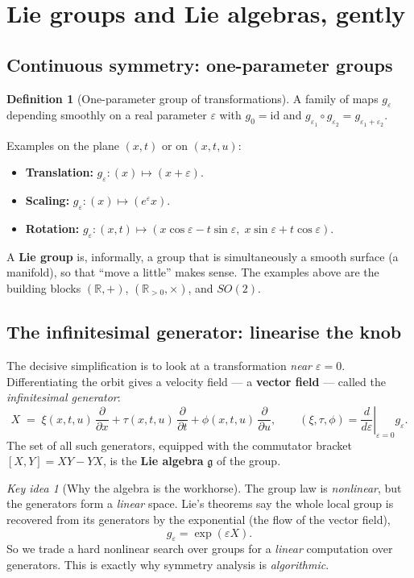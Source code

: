 \documentclass[11pt]{article}
\theoremstyle{definition}
\newtheorem{definition}{Definition}[section]
\theoremstyle{remark}
\newtheorem*{keyidea}{Key idea}
\newcommand{\g}{\mathfrak{g}}
\newcommand{\R}{\mathbb{R}}
\newcommand{\pd}[2]{\frac{\partial #1}{\partial #2}}
\begin{document}
\section{Lie groups and Lie algebras, gently}

\subsection{Continuous symmetry: one-parameter groups}

\begin{definition}[One-parameter group of transformations]
A family of maps $g_\varepsilon$ depending smoothly on a real parameter $\varepsilon$ with
$g_0=\mathrm{id}$ and $g_{\varepsilon_1}\circ g_{\varepsilon_2}=g_{\varepsilon_1+\varepsilon_2}$.
\end{definition}

Examples on the plane $(x,t)$ or on $(x,t,u)$:
\begin{itemize}[nosep]
  \item \textbf{Translation:} $g_\varepsilon:(x)\mapsto(x+\varepsilon)$.
  \item \textbf{Scaling:} $g_\varepsilon:(x)\mapsto(e^{\varepsilon}x)$.
  \item \textbf{Rotation:} $g_\varepsilon:(x,t)\mapsto(x\cos\varepsilon-t\sin\varepsilon,\;x\sin\varepsilon+t\cos\varepsilon)$.
\end{itemize}

A \textbf{Lie group} is, informally, a group that is simultaneously a smooth surface (a manifold), so
that ``move a little'' makes sense. The examples above are the building blocks $(\R,+)$,
$(\R_{>0},\times)$, and $SO(2)$.

\subsection{The infinitesimal generator: linearise the knob}

The decisive simplification is to look at a transformation \emph{near $\varepsilon=0$}. Differentiating
the orbit gives a velocity field --- a \textbf{vector field} --- called the \emph{infinitesimal
generator}:
\[
X \;=\; \xi(x,t,u)\,\pd{}{x} + \tau(x,t,u)\,\pd{}{t} + \phi(x,t,u)\,\pd{}{u},
\qquad
(\xi,\tau,\phi)=\left.\frac{d}{d\varepsilon}\right|_{\varepsilon=0} g_\varepsilon .
\]
The set of all such generators, equipped with the commutator bracket
$[X,Y]=XY-YX$, is the \textbf{Lie algebra} $\g$ of the group.

\begin{keyidea}[Why the algebra is the workhorse]
The group law is \emph{nonlinear}, but the generators form a \emph{linear} space. Lie's theorems say the
whole local group is recovered from its generators by the exponential (the flow of the vector field),
\[
g_\varepsilon=\exp(\varepsilon X).
\]
So we trade a hard nonlinear search over groups for a \emph{linear} computation over generators. This
is exactly why symmetry analysis is \emph{algorithmic}.
\end{keyidea}
\end{document}
